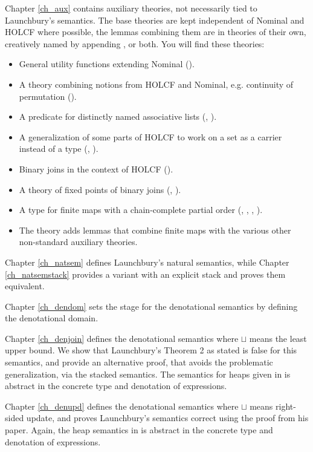 \documentclass[11pt,a4paper,parskip=half]{scrartcl}
\begin{document}
Chapter \ref{ch_aux} contains auxiliary theories, not necessarily tied to Launchbury's semantics. The base theories are kept independent of Nominal and HOLCF where possible, the lemmas combining them are in theories of their own, creatively named by appending ,  or both.  You will find these theories:
\begin{itemize}
\item General utility functions extending Nominal ().
\item A theory combining notions from HOLCF and Nominal, e.g. continuity of permutation ().
\item A predicate for distinctly named associative lists (, ). 
\item A generalization of some parts of HOLCF to work on a set as a carrier instead of a type (, ).
\item Binary joins in the context of HOLCF ().
\item A theory of fixed points of binary joins (, ).
\item A type for finite maps with a chain-complete partial order (, , , ).
\item The theory  adds lemmas that combine finite maps with the various other non-standard auxiliary theories.
\end{itemize}

Chapter \ref{ch_natsem} defines Launchbury's natural semantics, while Chapter \ref{ch_natsemstack} provides a variant with an explicit stack and proves them equivalent.

Chapter \ref{ch_dendom} sets the stage for the denotational semantics by defining the denotational domain.

Chapter \ref{ch_denjoin} defines the denotational semantics where $\sqcup$ means the least upper bound. We show that Launchbury's Theorem 2 as stated is false for this semantics, and provide an alternative proof, that avoids the problematic generalization, via the stacked semantics. The semantics for heaps given in  is abstract in the concrete type and denotation of expressions.

Chapter \ref{ch_denupd} defines the denotational semantics where $\sqcup$ means right-sided update, and proves Launchbury's semantics correct using the proof from his paper. Again, the heap semantics in  is abstract in the concrete type and denotation of expressions.
\end{document}
